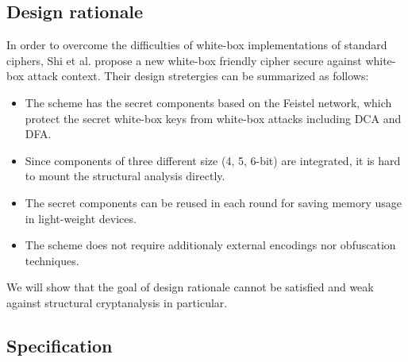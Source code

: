 \documentclass{ieeeaccess}
\begin{document}
\subsection{Design rationale}
In order to overcome the difficulties of white-box implementations
of standard ciphers, Shi et al. propose a new white-box friendly cipher secure 
against white-box attack context.
Their design stretergies can be summarized as follows:
\begin{itemize}
\item The scheme has the secret components
based on the Feistel network, which protect the secret white-box keys from
white-box attacks including DCA and DFA.
\item Since components of three different size (4, 5, 6-bit) are integrated,
it is hard to mount the structural analysis directly.
\item The secret components can be reused in each round for saving memory usage
in light-weight devices.
\item The scheme does not require additionaly external encodings
nor obfuscation techniques. 
\end{itemize}
We will show that the goal of design rationale cannot be satisfied
and weak against structural cryptanalysis in particular.

\subsection{Specification}
\end{document}
